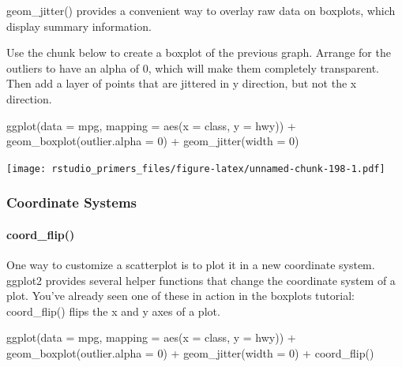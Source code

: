 \documentclass[
]{article}
\newenvironment{Shaded}{\begin{snugshade}}{\end{snugshade}}
\newcommand{\AttributeTok}[1]{\textcolor[rgb]{0.77,0.63,0.00}{#1}}
\newcommand{\DecValTok}[1]{\textcolor[rgb]{0.00,0.00,0.81}{#1}}
\newcommand{\FunctionTok}[1]{\textcolor[rgb]{0.00,0.00,0.00}{#1}}
\newcommand{\NormalTok}[1]{#1}
\newcommand{\SpecialCharTok}[1]{\textcolor[rgb]{0.00,0.00,0.00}{#1}}
\begin{document}
geom\_jitter() provides a convenient way to overlay raw data on
boxplots, which display summary information.

Use the chunk below to create a boxplot of the previous graph. Arrange
for the outliers to have an alpha of 0, which will make them completely
transparent. Then add a layer of points that are jittered in y
direction, but not the x direction.

\begin{Shaded}
\begin{Highlighting}[]
\FunctionTok{ggplot}\NormalTok{(}\AttributeTok{data =}\NormalTok{ mpg, }\AttributeTok{mapping =} \FunctionTok{aes}\NormalTok{(}\AttributeTok{x =}\NormalTok{ class, }\AttributeTok{y =}\NormalTok{ hwy)) }\SpecialCharTok{+}
  \FunctionTok{geom\_boxplot}\NormalTok{(}\AttributeTok{outlier.alpha =} \DecValTok{0}\NormalTok{) }\SpecialCharTok{+} 
  \FunctionTok{geom\_jitter}\NormalTok{(}\AttributeTok{width =} \DecValTok{0}\NormalTok{)}
\end{Highlighting}
\end{Shaded}

\texttt{[image: rstudio\_primers\_files/figure-latex/unnamed-chunk-198-1.pdf]}

\hypertarget{coordinate-systems}{%
\subsubsection{Coordinate Systems}\label{coordinate-systems}}

\hypertarget{coord_flip-1}{%
\paragraph{coord\_flip()}\label{coord_flip-1}}

One way to customize a scatterplot is to plot it in a new coordinate
system. ggplot2 provides several helper functions that change the
coordinate system of a plot. You've already seen one of these in action
in the boxplots tutorial: coord\_flip() flips the x and y axes of a
plot.

\begin{Shaded}
\begin{Highlighting}[]
\FunctionTok{ggplot}\NormalTok{(}\AttributeTok{data =}\NormalTok{ mpg, }\AttributeTok{mapping =} \FunctionTok{aes}\NormalTok{(}\AttributeTok{x =}\NormalTok{ class, }\AttributeTok{y =}\NormalTok{ hwy)) }\SpecialCharTok{+}
  \FunctionTok{geom\_boxplot}\NormalTok{(}\AttributeTok{outlier.alpha =} \DecValTok{0}\NormalTok{) }\SpecialCharTok{+}
  \FunctionTok{geom\_jitter}\NormalTok{(}\AttributeTok{width =} \DecValTok{0}\NormalTok{) }\SpecialCharTok{+}
  \FunctionTok{coord\_flip}\NormalTok{()}
\end{Highlighting}
\end{Shaded}
\end{document}
